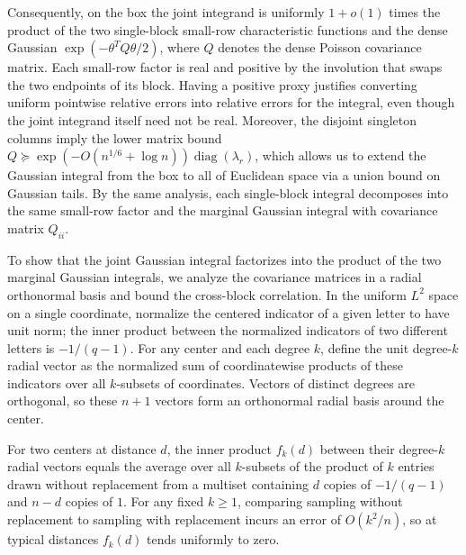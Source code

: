Consequently, on the box the joint integrand is uniformly \(1+o(1)\) times the product of the two single-block small-row characteristic functions and the dense Gaussian \(\exp(-\theta^TQ\theta/2)\), where \(Q\) denotes the dense Poisson covariance matrix. Each small-row factor is real and positive by the involution that swaps the two endpoints of its block. Having a positive proxy justifies converting uniform pointwise relative errors into relative errors for the integral, even though the joint integrand itself need not be real. Moreover, the disjoint singleton columns imply the lower matrix bound \(Q\succeq\exp(-O(n^{1/6}+\log n))\operatorname{diag}(\lambda_r)\), which allows us to extend the Gaussian integral from the box to all of Euclidean space via a union bound on Gaussian tails. By the same analysis, each single-block integral decomposes into the same small-row factor and the marginal Gaussian integral with covariance matrix \(Q_{ii}\).

To show that the joint Gaussian integral factorizes into the product of the two marginal Gaussian integrals, we analyze the covariance matrices in a radial orthonormal basis and bound the cross-block correlation. In the uniform \(L^2\) space on a single coordinate, normalize the centered indicator of a given letter to have unit norm; the inner product between the normalized indicators of two different letters is \(-1/(q-1)\). For any center and each degree \(k\), define the unit degree-\(k\) radial vector as the normalized sum of coordinatewise products of these indicators over all \(k\)-subsets of coordinates. Vectors of distinct degrees are orthogonal, so these \(n+1\) vectors form an orthonormal radial basis around the center.

For two centers at distance \(d\), the inner product \(f_k(d)\) between their degree-\(k\) radial vectors equals the average over all \(k\)-subsets of the product of \(k\) entries drawn without replacement from a multiset containing \(d\) copies of \(-1/(q-1)\) and \(n-d\) copies of \(1\). For any fixed \(k\ge1\), comparing sampling without replacement to sampling with replacement incurs an error of \(O(k^2/n)\), so at typical distances \(f_k(d)\) tends uniformly to zero.


